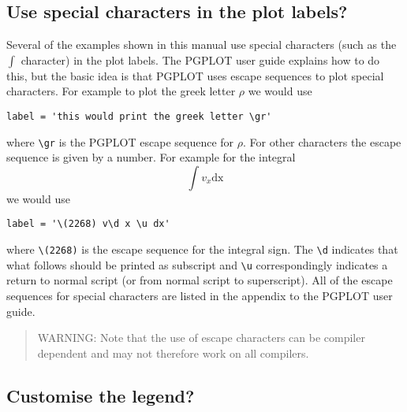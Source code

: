 \documentclass[a4paper,12pt]{article}
\begin{document}
\subsection{Use special characters in the plot labels?}
 Several of the examples shown in this manual use special characters (such as
the $\int$ character) in the plot labels. The PGPLOT user guide explains how to do
this, but the basic idea is that PGPLOT uses escape sequences to plot special
characters. For example to plot the greek letter $\rho$ we would use
\begin{verbatim}
label = 'this would print the greek letter \gr'
\end{verbatim}
where \verb+\gr+ is the PGPLOT escape sequence for $\rho$. For other
characters the escape sequence is given by a number. For example for the integral 
\begin{equation}
\int v_x \mathrm{dx}
\end{equation}
we would use
\begin{verbatim}
label = '\(2268) v\d x \u dx'
\end{verbatim}
where \verb+\(2268)+ is the escape sequence for the integral sign. The
\verb+\d+ indicates that what follows should be printed as subscript and
\verb+\u+ correspondingly indicates a return to normal script (or from normal script to
superscript). All of the escape sequences for special characters are listed in
the appendix to the PGPLOT user guide.
\begin{quote}
 WARNING: Note that the use of escape characters can be compiler dependent and
 may not therefore work on all compilers.
\end{quote}

\subsection{Customise the legend?}
\end{document}
